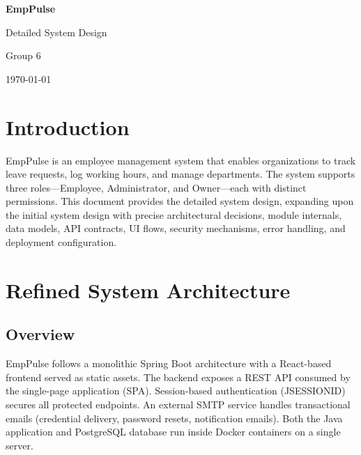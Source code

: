 \documentclass[11pt,a4paper]{article}
\begin{document}
\begin{titlepage}
\centering
\vspace*{3cm}
{\Huge\bfseries EmpPulse\par}
\vspace{0.5cm}
{\LARGE Detailed System Design\par}
\vspace{2cm}
{\Large Group 6\par}
\vspace{1cm}
{\large\today\par}
\vfill
\end{titlepage}

\tableofcontents
\newpage

\section{Introduction}

EmpPulse is an employee management system that enables organizations to track leave requests, log working hours, and manage departments. The system supports three roles---Employee, Administrator, and Owner---each with distinct permissions. This document provides the detailed system design, expanding upon the initial system design with precise architectural decisions, module internals, data models, API contracts, UI flows, security mechanisms, error handling, and deployment configuration.

\section{Refined System Architecture}
\label{sec:architecture}

\subsection{Overview}

EmpPulse follows a monolithic Spring Boot architecture with a React-based frontend served as static assets. The backend exposes a REST API consumed by the single-page application (SPA). Session-based authentication (JSESSIONID) secures all protected endpoints. An external SMTP service handles transactional emails (credential delivery, password resets, notification emails). Both the Java application and PostgreSQL database run inside Docker containers on a single server.
\end{document}
